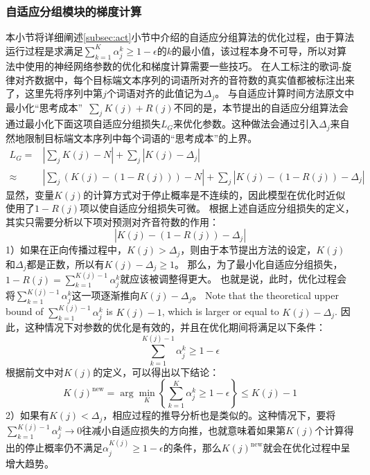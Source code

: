 \subsubsection{自适应分组模块的梯度计算}
本小节将详细阐述\ref{subsec:act}小节中介绍的自适应分组算法的优化过程，由于算法运行过程是求满足$\sum_{k=1}^K \alpha_j^k \geq 1-\epsilon$的$k$的最小值，该过程本身不可导，所以对算法中使用的神经网络参数的优化和梯度计算需要一些技巧。
在人工标注的歌词-旋律对齐数据中，每个目标端文本序列的词语所对齐的音符数的真实值都被标注出来了，这里先将序列中第$j$个词语对齐的此值记为$\Delta_j$。
与自适应计算时间方法\citep{act}原文中最小化``思考成本''~$\sum_j K(j) + R(j)$不同的是，本节提出的自适应分组算法会通过最小化下面这项自适应分组损失$L_G$来优化参数。这种做法会通过引入$\Delta_j$来自然地限制目标端文本序列中每个词语的``思考成本''的上界。
\begin{equation}
\begin{array}{rl}
    L_G = & \left| \sum_j K(j) - N \right| + \sum_j \left|K(j) - \Delta_j\right| \\
    \approx &\left|\sum_j \left(K(j) - (1 - R(j))\right) - N \right| + \sum_j \left|K(j) - (1 - R(j)) - \Delta_j\right|
\end{array}
\end{equation}
显然，变量$K(j)$的计算方式对于停止概率是不连续的，因此模型在优化时近似使用了$1-R(j)$项以使自适应分组损失可微。
根据上述自适应分组损失的定义，其实只需要分析以下项对预测对齐音符数的作用：
\begin{equation}
    \left| K(j) - (1 - R(j)) - \Delta_j \right|
\end{equation}
1）如果在正向传播过程中，$K(j) > \Delta_j$，则由于本节提出方法的设定，$K(j)$和$\Delta_j$都是正数，所以有$K(j) - \Delta_j \geq 1$。
那么，为了最小化自适应分组损失，$1 - R(j)=\sum_{k=1}^{K(j)-1}\alpha_j^k$就应该被调整得更大。
也就是说，此时，优化过程会将$\sum_{k=1}^{K(j)-1}\alpha_j^k$这一项逐渐推向$K(j) - \Delta_j$。
Note that the theoretical upper bound of $\sum_{k=1}^{K(j)-1}\alpha_j^k$ is $K(j)- 1$, which is larger or equal to $K(j)- \Delta_j$.
因此，这种情况下对参数的优化是有效的，并且在优化期间将满足以下条件：
\begin{equation}
    \sum_{k=1}^{K(j)-1}\alpha_j^k \geq 1 - \epsilon
\end{equation}
根据前文中对$K(j)$的定义，可以得出以下结论：
\begin{equation}
    K(j)^{\text{new}} = \arg\min_{K}\left\{\sum_{k=1}^K \alpha_j^k \geq 1 - \epsilon\right\} \leq K(j) - 1
\end{equation}
2）如果有$K(j) < \Delta_j$，相应过程的推导分析也是类似的。这种情况下，要将$\sum_{k=1}^{K(j)-1}\alpha_j^k\rightarrow0$往减小自适应损失的方向推，也就意味着如果第$K(j)$个计算得出的停止概率仍不满足$\alpha_j^{K(j)} \geq 1-\epsilon$的条件，那么$K(j)^{\text{new}}$就会在优化过程中呈增大趋势。
